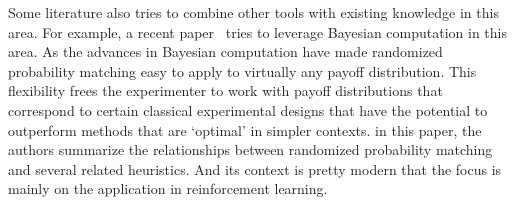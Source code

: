 \documentclass[11pt]{article}
\begin{document}
Some literature also tries to combine other tools with existing knowledge in this area. For example, a recent paper~\cite{scott2010modern} tries to leverage Bayesian computation in this area. As the  advances in Bayesian computation have made randomized probability matching easy to apply to virtually any payoff distribution. This flexibility frees the experimenter to work with payoff distributions that correspond to certain classical experimental designs that have the potential to outperform methods that are ‘optimal’ in simpler contexts. in this paper, the authors summarize the relationships between randomized probability matching and several related heuristics. And its context is pretty modern that the focus is mainly on the application in reinforcement learning. 


\end{document}
